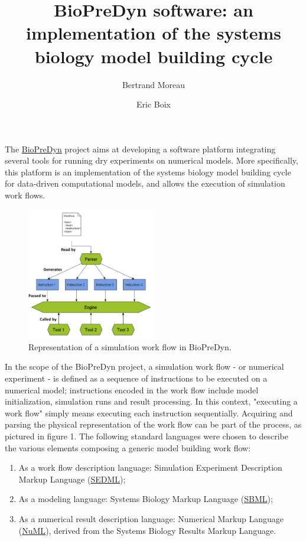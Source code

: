 \documentclass{llncs}
\begin{document}
\title{BioPreDyn software: an implementation of the systems biology model
building cycle}
\author{Bertrand Moreau \and Eric Boix}
\maketitle

The \href{http://www.biopredyn.eu/}{BioPreDyn} project aims at developing a
software platform integrating several tools for running dry experiments on
numerical models. More specifically, this platform is an implementation of the
systems biology model building cycle for data-driven computational
models\cite{Kitano2002}, and allows the execution of simulation work flows.

\begin{figure}[!hbtp]
  \centering
  \includegraphics[width=0.5\textwidth]{proposal_complete}
  \caption{Representation of a simulation work flow in BioPreDyn.}
\end{figure}
In the scope of the BioPreDyn project, a simulation work flow - or
numerical experiment - is defined as a sequence of instructions to be executed
on a numerical model; instructions encoded in the work flow include model
initialization, simulation runs and result processing. In this context,
"executing a work flow" simply means executing each instruction sequentially.
Acquiring and parsing the physical representation of the work flow can be part
of the process, as pictured in figure 1. The following standard languages were
chosen to describe the various elements composing a generic model building work
flow:
\begin{enumerate}
\item As a work flow description language: Simulation Experiment Description
Markup Language (\href{http://sed-ml.org/}{SEDML});
\item As a modeling language: Systems Biology Markup Language
(\href{http://sbml.org}{SBML});
\item As a numerical result description language: Numerical Markup Language
(\href{http://code.google.com/p/numl/}{NuML}), derived from the Systems Biology
Results Markup Language.
\end{enumerate}
\end{document}
